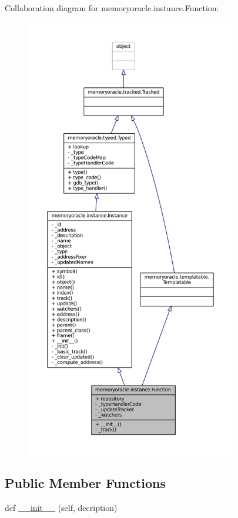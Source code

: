 Collaboration diagram for memoryoracle.\+instance.\+Function\+:\nopagebreak
\begin{figure}[H]
\begin{center}
\leavevmode
\includegraphics[height=550pt]{classmemoryoracle_1_1instance_1_1Function__coll__graph}
\end{center}
\end{figure}
\subsection*{Public Member Functions}
\begin{DoxyCompactItemize}
\item 
def \hyperlink{classmemoryoracle_1_1instance_1_1Function_a11f0a673a53716d303071d1be8077fc6}{\+\_\+\+\_\+init\+\_\+\+\_\+} (self, decription)
\end{DoxyCompactItemize}
